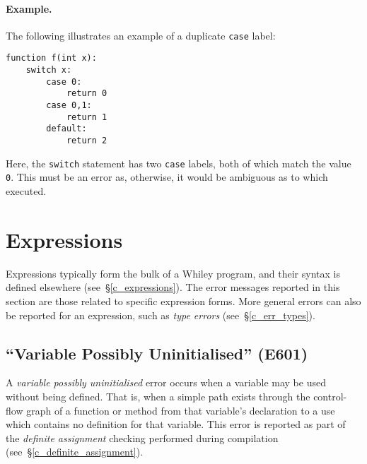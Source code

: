 \paragraph{Example.}  The following illustrates an example of a duplicate \lstinline{case} label:

\begin{lstlisting}
function f(int x):
    switch x:
        case 0:
            return 0
        case 0,1:
            return 1
        default:
            return 2
\end{lstlisting}

Here, the \lstinline{switch} statement has two \lstinline{case} labels, both of which match the value \lstinline{0}.  This must be an error as, otherwise, it would be ambiguous as to which executed.


\section{Expressions}




Expressions typically form the bulk of a Whiley program, and their syntax is defined elsewhere (see~\S\ref{c_expressions}).  The error messages reported in this section are those related to specific expression forms.  More general errors can also be reported for an expression, such as {\em type errors} (see~\S\ref{c_err_types}).

\subsection{``Variable Possibly Uninitialised'' (E601)}
\label{c_err_var_uninitialised}
A {\em variable possibly uninitialised} error occurs when a variable may be used without being defined.  That is, when a simple path exists through the control-flow graph of a function or method from that variable's declaration to a use which contains no definition for that variable.  This error is reported as part of the {\em definite assignment} checking performed during compilation (see~\S\ref{c_definite_assignment}).

